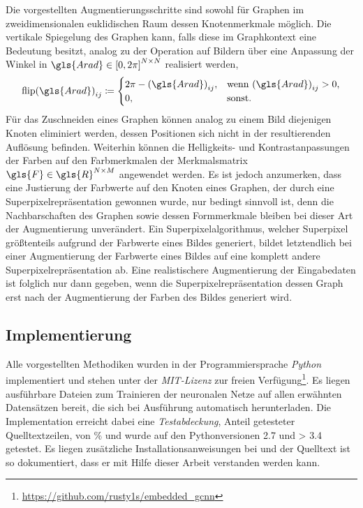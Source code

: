 Die vorgestellten Augmentierungsschritte sind sowohl für Graphen im zweidimensionalen euklidischen Raum \bzw{} dessen Knotenmerkmale möglich.
Die vertikale Spiegelung des Graphen kann, falls diese im Graphkontext eine Bedeutung besitzt, analog zu der Operation auf Bildern über eine Anpassung der Winkel in $\gls{Arad} \in {\left[0, 2\pi\right]}^{N \times N}$ realisiert werden, \dhe{}
\begin{equation*}
  {\mathrm{flip}\left(\gls{Arad}\right)}_{ij} \coloneqq \begin{cases}
    2\pi - {\left(\gls{Arad}\right)}_{ij}, & \text{wenn } {\left(\gls{Arad}\right)}_{ij} > 0,\\
    0, & \text{sonst.}
  \end{cases}
\end{equation*}
Für das Zuschneiden eines Graphen können analog zu einem Bild diejenigen Knoten eliminiert werden, dessen Positionen sich nicht in der resultierenden Auflösung befinden.
Weiterhin können die Helligkeits- und Kontrastanpassungen der Farben auf den Farbmerkmalen der Merkmalsmatrix $\gls{F} \in \gls{R}^{N \times M}$ angewendet werden.
Es ist jedoch anzumerken, dass eine Justierung der Farbwerte auf den Knoten eines Graphen, der durch eine Superpixelrepräsentation gewonnen wurde, nur bedingt sinnvoll ist, denn die Nachbarschaften des Graphen sowie dessen Formmerkmale bleiben bei dieser Art der Augmentierung unverändert.
Ein Superpixelalgorithmus, welcher Superpixel größtenteils aufgrund der Farbwerte eines Bildes generiert, bildet letztendlich bei einer Augmentierung der Farbwerte eines Bildes auf eine komplett andere Superpixelrepräsentation ab.
Eine realistischere Augmentierung der Eingabedaten ist folglich nur dann gegeben, wenn die Superpixelrepräsentation \bzw{} dessen Graph erst nach der Augmentierung der Farben des Bildes generiert wird.

\subsection{Implementierung}
\label{implementierung}

Alle vorgestellten Methodiken wurden in der Programmiersprache \emph{Python} implementiert und stehen unter der \emph{MIT-Lizenz} zur freien Verfügung\footnote{\url{https://github.com/rusty1s/embedded\_gcnn}}.
Es liegen ausführbare Dateien zum Trainieren der neuronalen Netze auf allen erwähnten Datensätzen bereit, die sich bei Ausführung automatisch herunterladen.
Die Implementation erreicht dabei eine \emph{Testabdeckung}, \dhe{} Anteil getesteter Quelltextzeilen, von \codecov{}\% und wurde auf den Pythonversionen 2.7 und > 3.4 getestet.
Es liegen zusätzliche Installationsanweisungen bei und der Quelltext ist so dokumentiert, dass er mit Hilfe dieser Arbeit verstanden werden kann.

